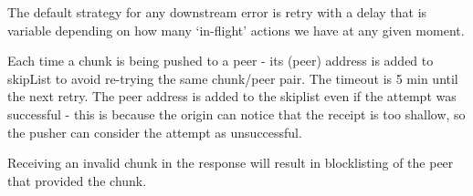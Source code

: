 The default strategy for any downstream error is retry with a delay that
is variable depending on how many `in-flight' actions we have at any
given moment.

Each time a chunk is being pushed to a peer - its (peer) address is
added to skipList to avoid re-trying the same chunk/peer pair. The
timeout is 5 min until the next retry. The peer address is added to the
skiplist even if the attempt was successful - this is because the origin
can notice that the receipt is too shallow, so the pusher can consider
the attempt as unsuccessful.

Receiving an invalid chunk in the response will result in blocklisting
of the peer that provided the chunk.









